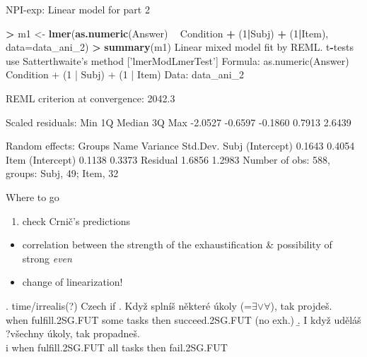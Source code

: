 \documentclass[ignorenonframetext,]{beamer}
\newenvironment{Shaded}{\begin{snugshade}}{\end{snugshade}}
\newcommand{\KeywordTok}[1]{\textcolor[rgb]{0.13,0.29,0.53}{\textbf{#1}}}
\newcommand{\DataTypeTok}[1]{\textcolor[rgb]{0.13,0.29,0.53}{#1}}
\newcommand{\DecValTok}[1]{\textcolor[rgb]{0.00,0.00,0.81}{#1}}
\newcommand{\StringTok}[1]{\textcolor[rgb]{0.31,0.60,0.02}{#1}}
\newcommand{\OperatorTok}[1]{\textcolor[rgb]{0.81,0.36,0.00}{\textbf{#1}}}
\newcommand{\NormalTok}[1]{#1}
\providecommand{\tightlist}{%
  \setlength{\itemsep}{0pt}\setlength{\parskip}{0pt}}
\begin{document}
\begin{frame}[fragile]{NPI-exp: Linear model for part 2}

\tiny

\begin{Shaded}
\begin{Highlighting}[]
\OperatorTok{>}\StringTok{ }\NormalTok{m1 <-}\StringTok{ }\KeywordTok{lmer}\NormalTok{(}\KeywordTok{as.numeric}\NormalTok{(Answer) }\OperatorTok{~}\StringTok{ }\NormalTok{Condition }\OperatorTok{+}\StringTok{ }\NormalTok{(}\DecValTok{1}\OperatorTok{|}\NormalTok{Subj) }\OperatorTok{+}\StringTok{ }\NormalTok{(}\DecValTok{1}\OperatorTok{|}\NormalTok{Item), }\DataTypeTok{data=}\NormalTok{data_ani_}\DecValTok{2}\NormalTok{)}
\OperatorTok{>}\StringTok{ }\KeywordTok{summary}\NormalTok{(m1)}
\NormalTok{Linear mixed model fit by REML. t}\OperatorTok{-}\NormalTok{tests use Satterthwaite}\StringTok{'s method ['}\NormalTok{lmerModLmerTest}\StringTok{']}
\StringTok{Formula: as.numeric(Answer) ~ Condition + (1 | Subj) + (1 | Item)}
\StringTok{   Data: data_ani_2}

\StringTok{REML criterion at convergence: 2042.3}

\StringTok{Scaled residuals: }
\StringTok{    Min      1Q  Median      3Q     Max }
\StringTok{-2.0527 -0.6597 -0.1860  0.7913  2.6439 }

\StringTok{Random effects:}
\StringTok{ Groups   Name        Variance Std.Dev.}
\StringTok{ Subj     (Intercept) 0.1643   0.4054  }
\StringTok{ Item     (Intercept) 0.1138   0.3373  }
\StringTok{ Residual             1.6856   1.2983  }
\StringTok{Number of obs: 588, groups:  Subj, 49; Item, 32}
\end{Highlighting}
\end{Shaded}

\end{frame}

\begin{frame}{Where to go}

\begin{enumerate}
\def\labelenumi{\arabic{enumi})}
\tightlist
\item
  check Crnič's predictions
\end{enumerate}

\begin{itemize}
\tightlist
\item
  correlation between the strength of the exhaustification \&
  possibility of strong \emph{even}
\item
  change of linearization!
\end{itemize}

\ex. time/irrealis(?) Czech if \a. Když splníš některé úkoly
(=\(\exists \vee \forall\)), tak projdeš.\\
when fulfill.2SG.FUT some tasks then succeed.2SG.FUT (no exh.) \b. I
když uděláš ?všechny úkoly, tak propadneš.\\
i when fulfill.2SG.FUT all tasks then fail.2SG.FUT

\end{frame}
\end{document}
